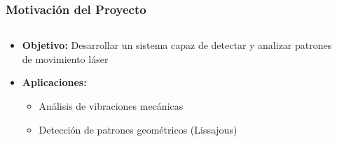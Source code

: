 \documentclass[xcolor=dvipsnames]{beamer}
\begin{document}
\begin{frame}
    \frametitle{Motivación del Proyecto}
    \begin{columns}
        \begin{column}{0.6\textwidth}
            \begin{itemize}
                \item<1-> \textbf{Objetivo:} Desarrollar un sistema capaz de detectar y analizar patrones de movimiento láser
                \item<2-> \textbf{Aplicaciones:}
                \begin{itemize}
                    \item Análisis de vibraciones mecánicas
                    \item Detección de patrones geométricos (Lissajous)
                \end{itemize}
            \end{itemize}
        \end{column}
        \begin{column}{0.4\textwidth}
            \begin{center}

\end{center}
\end{column}
\end{columns}
\end{frame}
\end{document}
